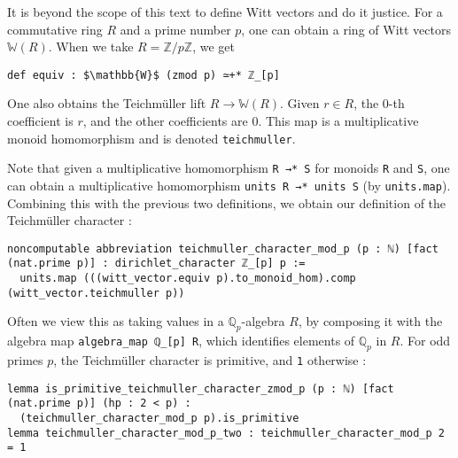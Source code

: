 \documentclass[a4paper,UKenglish,cleveref, autoref, thm-restate]{lipics-v2021}
\newcommand{\lean}[1]{\texttt{#1}\xspace} %
\begin{document}
It is beyond the scope of this text to define Witt vectors and do it justice. For a commutative ring
$R$ and a prime number $p$, one can obtain a ring of Witt vectors $\mathbb{W}(R)$.
When we take $R = \mathbb{Z}/p \mathbb{Z}$, we get 
\begin{lstlisting}
def equiv : $\mathbb{W}$ (zmod p) ≃+* ℤ_[p]
\end{lstlisting}
One also obtains the Teichmüller lift $R \to \mathbb{W} (R)$. Given $r \in R$, 
the 0-th coefficient is $r$, and the other coefficients are 0. This map is a 
multiplicative monoid homomorphism and is denoted \lean{teichmuller}. 

Note that given a multiplicative homomorphism \lean{R →* S} for monoids \lean{R} 
and \lean{S}, one can obtain a multiplicative homomorphism \lean{units R →* units S} 
(by \lean{units.map}). Combining this with the previous two 
definitions, we obtain our definition of the Teichmüller character : 
\begin{lstlisting}
noncomputable abbreviation teichmuller_character_mod_p (p : ℕ) [fact (nat.prime p)] : dirichlet_character ℤ_[p] p :=
  units.map (((witt_vector.equiv p).to_monoid_hom).comp (witt_vector.teichmuller p))
\end{lstlisting}
Often we view this as taking values in a $\mathbb{Q}_p$-algebra $R$, by composing it 
with the algebra map \lean{algebra\_map ℚ\_[p] R}, which identifies elements of $\mathbb{Q}_p$ 
in $R$. \newline
For odd primes $p$, the Teichmüller character is primitive, and \lean{1} otherwise : 
\begin{lstlisting}
lemma is_primitive_teichmuller_character_zmod_p (p : ℕ) [fact (nat.prime p)] (hp : 2 < p) : 
  (teichmuller_character_mod_p p).is_primitive
lemma teichmuller_character_mod_p_two : teichmuller_character_mod_p 2 = 1
\end{lstlisting}
\end{document}
